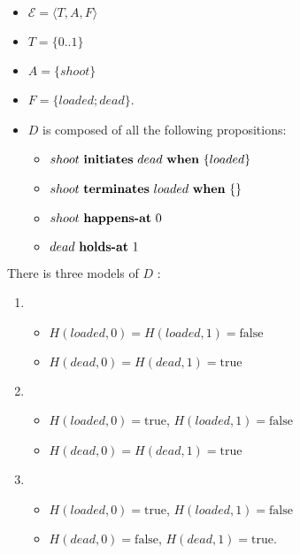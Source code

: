 \begin{itemize}
  \item $\mathcal{E}=\langle T,A,F\rangle$
  \item $T=\{0..1\}$
  \item $A=\{shoot\}$
  \item $F=\{loaded;dead\}$.
  \item $D$ is composed of all the following propositions:
  \begin{itemize}
    \item $shoot \text{ \textbf{initiates} } dead \text{  \textbf{when} } \{loaded\}$
    \item $shoot \text{ \textbf{terminates} } loaded \text{  \textbf{when} } \{\}$
    \item $shoot \text{  \textbf{happens-at} } 0$
    \item $dead \text{  \textbf{holds-at} } 1$
  \end{itemize}
\end{itemize}

There is three models of $D$ :
\begin{enumerate}
  \item \begin{itemize}
    \item $H(loaded,0)=H(loaded,1)=\text{false}$
    \item $H(dead,0)=H(dead,1)=\text{true}$
  \end{itemize}
  \item \begin{itemize}
    \item $H(loaded,0)=\text{true}$, $H(loaded,1)=\text{false}$
    \item $H(dead,0)=H(dead,1)=\text{true}$
  \end{itemize}
  \item \begin{itemize}
    \item $H(loaded,0)=\text{true}$, $H(loaded,1)=\text{false}$
    \item $H(dead,0)=\text{false}$, $H(dead,1)=\text{true}$.
  \end{itemize}
\end{enumerate}
